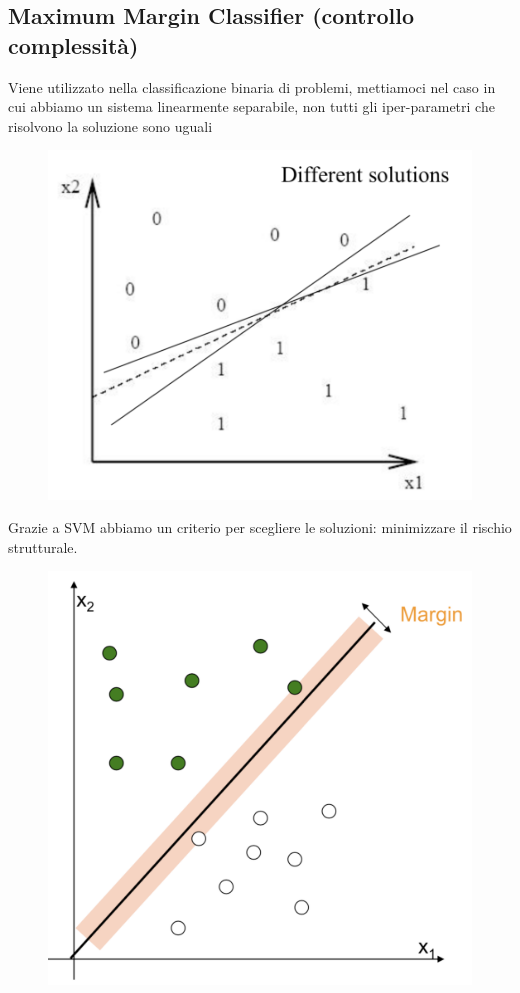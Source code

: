 \documentclass{article}
\begin{document}
\subsection{Maximum Margin Classifier (controllo complessità)}
Viene utilizzato nella classificazione binaria di problemi, mettiamoci nel caso in cui abbiamo un sistema linearmente separabile, non tutti gli iper-parametri che risolvono la soluzione sono uguali
\begin{figure}[H]
\centering
\includegraphics[scale=0.4]{Images/svmmultiplesolution.png}
\end{figure}
Grazie a SVM abbiamo un criterio per scegliere le soluzioni: minimizzare il rischio strutturale.
\begin{figure}[H]
\centering
\includegraphics[scale=0.4]{Images/svmmargin.png}
\end{figure}
\end{document}

